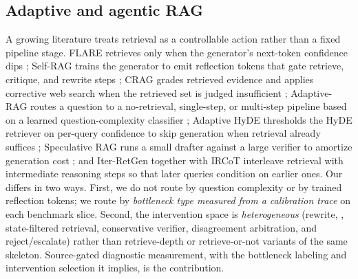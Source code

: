 \subsection{Adaptive and agentic RAG}
A growing literature treats retrieval as a controllable action rather than a
fixed pipeline stage. FLARE retrieves only when the generator's
next-token confidence dips \citep{jiang2023flare}; Self-RAG trains the
generator to emit reflection tokens that gate retrieve, critique, and rewrite
steps \citep{asai2024selfrag}; CRAG grades retrieved evidence and applies
corrective web search when the retrieved set is judged insufficient
\citep{yan2024crag}; Adaptive-RAG routes a question to a no-retrieval,
single-step, or multi-step pipeline based on a learned question-complexity
classifier \citep{jeong2024adaptive}; Adaptive HyDE thresholds the HyDE
retriever on per-query confidence to skip generation when retrieval already
suffices \citep{lei2025adaptivehyde}; Speculative RAG runs a small drafter
against a large verifier to amortize generation cost
\citep{wang2025specrag}; and Iter-RetGen \citep{shao2023iterretgen} together
with IRCoT \citep{trivedi2023ircot} interleave retrieval with intermediate
reasoning steps so that later queries condition on earlier ones. Our
\controller{} differs in two ways. First, we do not route by question
complexity or by trained reflection tokens; we route by \emph{bottleneck type
measured from a calibration trace} on each benchmark slice. Second, the
intervention space is \emph{heterogeneous} (rewrite, \hyre{}, state-filtered
retrieval, conservative verifier, disagreement arbitration, and
reject/escalate) rather than retrieve-depth or retrieve-or-not variants of
the same skeleton. Source-gated diagnostic measurement, with the bottleneck
labeling and intervention selection it implies, is the contribution.

